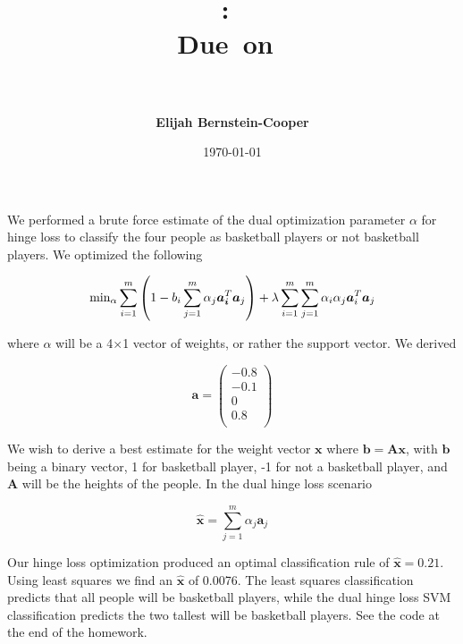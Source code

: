 \documentclass{article}
\title{\vspace{0in}
    \textmd{\textbf{\hmwkClass:\ \hmwkTitle}}\\
    \normalsize\vspace{0.1in}\small{Due\ on\ \hmwkDueDate}\\
    \vspace{0.1in}\large{\textit{\hmwkClassInstructor\ \hmwkClassTime}}
    \vspace{0.5in}}
\author{\textbf{Elijah Bernstein-Cooper}}
\date{\today} %
\begin{document}
\maketitle

\begin{homeworkProblem}
   
    We performed a brute force estimate of the dual optimization parameter
    $\alpha$ for hinge loss to classify the four people as basketball players
    or not basketball players. We optimized the following

    \begin{equation}
        {\rm min_{\alpha}} \sum_{i=1}^m \left(1 - b_i\sum_{j=1}^m\alpha_j 
        \bm{a_i}^T \bm{a}_j \right) + \lambda \sum_{i=1}^m \sum_{j=1}^m \alpha_i
        \alpha_j \bm{a}_i^T \bm{a}_j
    \end{equation}

    \noindent where $\alpha$ will be a 4$\times$1 vector of weights, or rather
    the support vector. We derived
  
    \begin{equation}
    \bm{a} = \left(\begin{matrix} -0.8 \\ -0.1 \\ 0 \\ 0.8 \\ 
    \end{matrix} \right)
    \end{equation}

    We wish to derive a best estimate for the weight vector $\bm{x}$ where
    $\bm{b} = \bm{Ax}$, with $\bm{b}$ being a binary vector, 1 for basketball
    player, -1 for not a basketball player, and $\bm{A}$ will be the heights of
    the people. In the dual hinge loss scenario

    \begin{equation}
        \bm{\hat{x}} = \sum_{j=1}^m \alpha_j \bm{a}_j
    \end{equation}

    Our hinge loss optimization produced an optimal classification rule of
    $\bm{\hat{x}} = 0.21$. Using least squares we find an $\bm{\hat{x}}$ of
    0.0076. The least squares classification predicts that all people will be
    basketball players, while the dual hinge loss SVM classification predicts
    the two tallest will be basketball players. See the code at the end of the
    homework.

\end{homeworkProblem}
\clearpage
\end{document}
